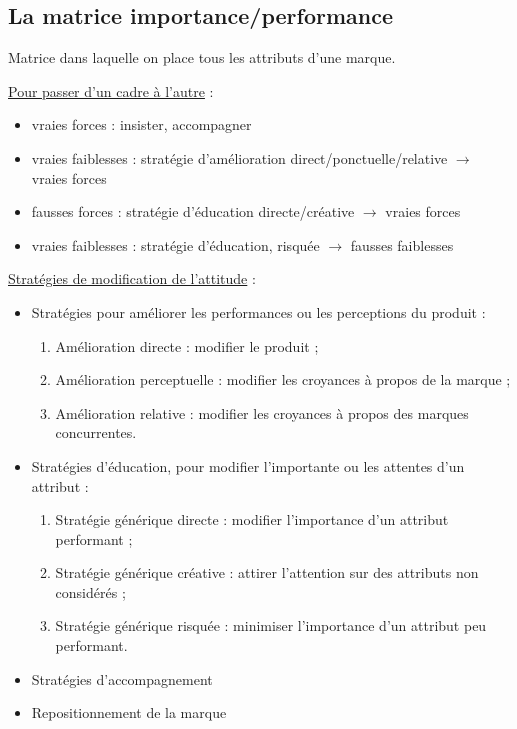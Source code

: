 	
		\subsection{La matrice importance/performance}
		
		Matrice dans laquelle on place tous les attributs d'une marque.
		
		
		\underline{Pour passer d'un cadre à l'autre} :
		\begin{itemize}
			\item vraies forces : insister, accompagner
			\item vraies faiblesses : stratégie d'amélioration direct/ponctuelle/relative $\rightarrow$ vraies forces
			\item fausses forces : stratégie d'éducation directe/créative $\rightarrow$ vraies forces
			\item vraies faiblesses : stratégie  d'éducation, risquée $\rightarrow$ fausses faiblesses
		\end{itemize}
	
	\n

	\underline{Stratégies de modification de l'attitude} :
	
	\begin{itemize}
		\item Stratégies pour améliorer les performances ou les perceptions du produit :
		
		\begin{enumerate}
			\item Amélioration directe : modifier le produit ;
			\item Amélioration perceptuelle : modifier les croyances à propos de la marque ;
			\item Amélioration relative : modifier les croyances à propos des marques concurrentes.
		\end{enumerate}	
		
		\item Stratégies d'éducation, pour modifier l'importante ou les attentes d'un attribut :
		
		\begin{enumerate}
			\item Stratégie générique directe : modifier  l'importance d'un attribut performant ;
			\item Stratégie générique créative : attirer l'attention sur des attributs non considérés ;
			\item Stratégie générique risquée : minimiser l'importance d'un attribut peu performant.
		\end{enumerate}
		
		\item Stratégies d'accompagnement
		\item Repositionnement de la marque
	\end{itemize}
	
